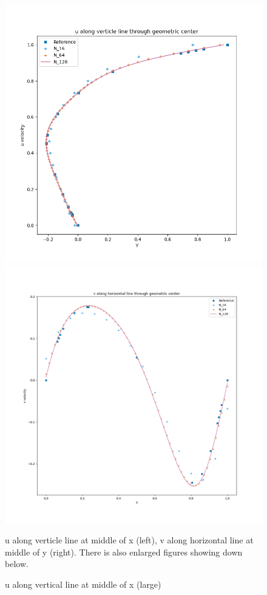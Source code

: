 \documentclass[12pt]{article}
\begin{document}
\begin{figure}[H]
    \centering
    \includegraphics[width=0.5\linewidth]{figures/u along verticle line through geometric center.png}
    \hspace{-8mm} %
    \includegraphics[width=0.5\linewidth]{figures/v along horizontal line through geometric center.png }
    \caption{u along verticle line at middle of x (left), v along horizontal line at middle of y (right). There is also enlarged figures showing down below.}
\end{figure}


\begin{figure}[H]
    \centering
    \caption{u along vertical line at middle of x (large)}
\end{figure}
\end{document}
